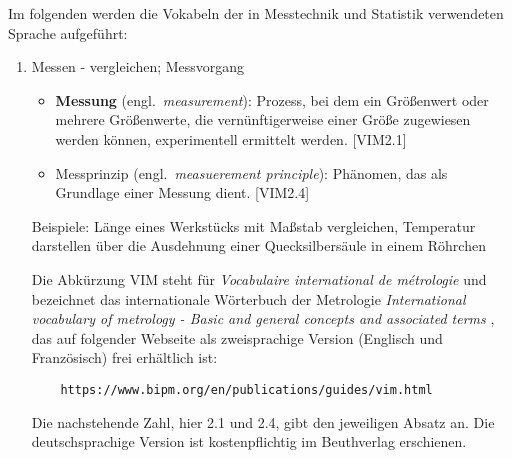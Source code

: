 \begin{raggedright}
Im folgenden werden die Vokabeln der in Messtechnik und Statistik verwendeten Sprache aufgeführt:
\begin{enumerate}
\item Messen - vergleichen; Messvorgang
	\begin{itemize}
	\item \textbf{Messung} (engl.\ \textsl{measurement}): Prozess, bei dem ein Größenwert oder mehrere Grö\-ßen\-werte, die
	vernünftigerweise einer Größe zugewiesen werden können, experimentell ermittelt werden. [VIM2.1]
	\item Messprinzip (engl.\ \textsl{measuerement principle}): Phänomen, das als Grundlage einer
	Messung dient. [VIM2.4]
	\end{itemize}
	Beispiele: Länge eines Werkstücks mit Maßstab vergleichen, Temperatur darstellen über
	die Ausdehnung einer Quecksilbersäule in einem Röhrchen

	Die Abkürzung VIM steht für \textsl{Vocabulaire international de m{\'e}trologie}
	und bezeichnet das internationale Wörterbuch der Metrologie
	\textsl{International vocabulary of metrology -
	Basic and general concepts and associated terms} \cite{VIM08}, das auf folgender Webseite als zweisprachige
	Version (Englisch und Französisch) frei erhältlich ist:
	\begin{verbatim}
	https://www.bipm.org/en/publications/guides/vim.html
	\end{verbatim}
	Die nachstehende Zahl, hier 2.1 und 2.4, gibt den jeweiligen Absatz an. Die deutschsprachige
	Version ist kostenpflichtig im Beuthverlag erschienen.


\end{enumerate}
\end{raggedright}
